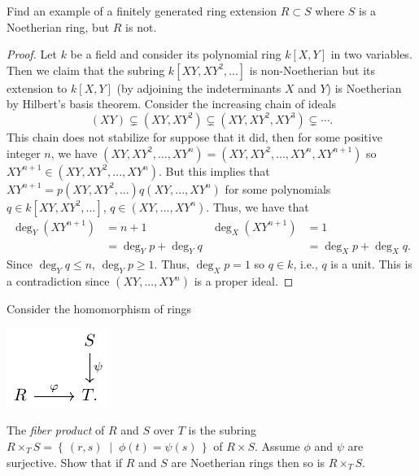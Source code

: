 \begin{problem}
Find an example of a finitely generated ring extension $R\subset
S$ where $S$ is a Noetherian ring, but $R$ is not.
\end{problem}
\begin{proof}
Let $k$ be a field and consider its polynomial ring $k[X,Y]$ in
two variables. Then we claim that the subring
$k[XY,XY^2,...]$ is non-Noetherian but its extension to
$k[X,Y]$ (by adjoining the indeterminants $X$ and $Y$)
is Noetherian by Hilbert's basis theorem. Consider the increasing
chain of ideals
\[
(XY)\subsetneq (XY,XY^2)\subsetneq(XY,XY^2,XY^3)\subsetneq\cdots.
\]
This chain does not stabilize for suppose that it did, then for
some positive integer $n$, we have
$(XY,XY^2,...,XY^n)=(XY,XY^2,...,XY^n,XY^{n+1})$ so
$XY^{n+1}\in(XY,XY^2,...,XY^n)$. But this implies that
$XY^{n+1}=p(XY,XY^2,...)q(XY,...,XY^n)$ for some polynomials $q\in
k[XY,XY^2,...]$, $q\in(XY,...,XY^n)$. Thus, we have that
\begin{align*}
\deg_Y(XY^{n+1})
&=n+1
&\deg_X(XY^{n+1})
&=1
\\
&=\deg_Y p+\deg_Y q
&&=\deg_X p+\deg_X q.
\end{align*}
Since $\deg_Y q\leq n$, $\deg_Y p\geq 1$. Thus, $\deg_X p=1$ so
$q\in k$, i.e., $q$ is a unit. This is a contradiction since
$(XY,...,XY^n)$ is a proper ideal.
\end{proof}
\newpage
\begin{problem}
Consider the homomorphism of rings
\begin{center}
\includegraphics{figures/hw-4-ring-maps}
\end{center}
The \emph{fiber product} of $R$ and $S$ over $T$ is the subring
$R\times_T S=\left\{\,(r,s)\;\middle|\;\phi(t)=\psi(s)\,\right\}$
of $R\times S$. Assume $\phi$ and $\psi$ are surjective. Show
that if $R$ and $S$ are Noetherian rings then so is $R\times_T
S$.
\end{problem}
